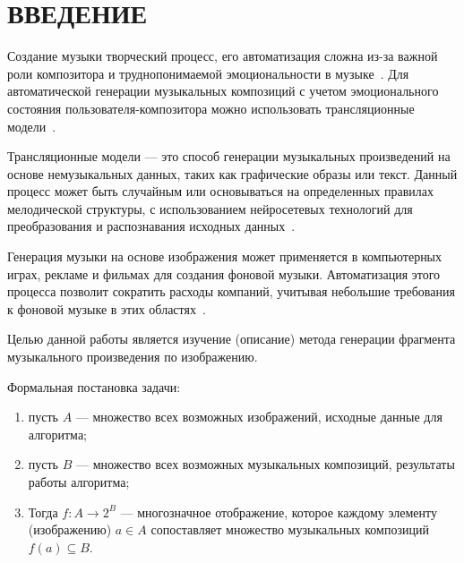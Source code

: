 \chapter*{ВВЕДЕНИЕ}

Создание музыки творческий процесс, его автоматизация сложна из-за важной роли композитора и труднопонимаемой эмоциональности в музыке~\cite{big}.
Для автоматической генерации музыкальных композиций с учетом эмоционального состояния пользователя-композитора можно использовать трансляционные модели~\cite{web}.

Трансляционные модели --- это способ генерации музыкальных произведений на основе немузыкальных данных, таких как графические образы или текст.
Данный процесс может быть случайным или основываться на определенных правилах мелодической структуры, с использованием нейросетевых технологий для преобразования и распознавания исходных данных~\cite{translation}.

Генерация музыки на основе изображения может применяется в компьютерных играх, рекламе и фильмах для создания фоновой музыки. 
Автоматизация этого процесса позволит сократить расходы компаний, учитывая небольшие требования к фоновой музыке в этих областях~\cite{actuality}.

Целью данной работы является изучение (описание) метода генерации фрагмента музыкального произведения по изображению.

Формальная постановка задачи: 
\begin{enumerate}
	\item пусть $A$ --- множество всех возможных изображений, исходные данные для алгоритма;
	\item пусть $B$ --- множество всех возможных музыкальных композиций, результаты работы алгоритма;
    \item Тогда $f: A \rightarrow 2^B$ --- многозначное отображение, которое каждому элементу (изображению) $a \in A$ сопоставляет множество музыкальных композиций $f(a) \subseteq B$.
\end{enumerate}

